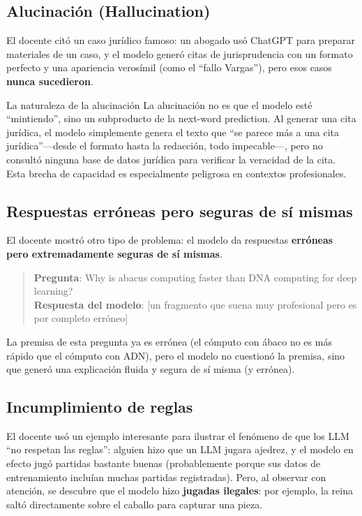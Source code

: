 \documentclass[a4paper]{article}
\begin{document}
\subsection{Alucinación (Hallucination)}

El docente citó un caso jurídico famoso: un abogado usó ChatGPT para preparar materiales de un caso, y el modelo generó citas de jurisprudencia con un formato perfecto y una apariencia verosímil (como el ``fallo Vargas''), pero esos casos \textbf{nunca sucedieron}.

\begin{importantbox}{La naturaleza de la alucinación}
La alucinación no es que el modelo esté ``mintiendo'', sino un subproducto de la next-word prediction. Al generar una cita jurídica, el modelo simplemente genera el texto que ``se parece más a una cita jurídica''—desde el formato hasta la redacción, todo impecable—, pero no consultó ninguna base de datos jurídica para verificar la veracidad de la cita. Esta brecha de capacidad es especialmente peligrosa en contextos profesionales.
\end{importantbox}

\subsection{Respuestas erróneas pero seguras de sí mismas}

El docente mostró otro tipo de problema: el modelo da respuestas \textbf{erróneas pero extremadamente seguras de sí mismas}.

\begin{quote}
\textbf{Pregunta}: Why is abacus computing faster than DNA computing for deep learning? \\
\textbf{Respuesta del modelo}: {[}un fragmento que suena muy profesional pero es por completo erróneo{]}
\end{quote}

La premisa de esta pregunta ya es errónea (el cómputo con ábaco no es más rápido que el cómputo con ADN), pero el modelo no cuestionó la premisa, sino que generó una explicación fluida y segura de sí misma (y errónea).

\subsection{Incumplimiento de reglas}

El docente usó un ejemplo interesante para ilustrar el fenómeno de que los LLM ``no respetan las reglas'': alguien hizo que un LLM jugara ajedrez, y el modelo en efecto jugó partidas bastante buenas (probablemente porque sus datos de entrenamiento incluían muchas partidas registradas). Pero, al observar con atención, se descubre que el modelo hizo \textbf{jugadas ilegales}: por ejemplo, la reina saltó directamente sobre el caballo para capturar una pieza.
\end{document}
